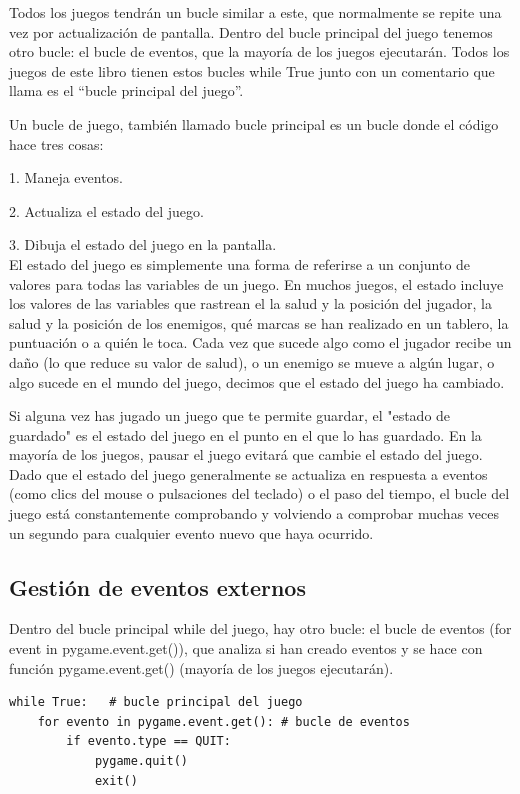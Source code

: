 Todos los juegos tendrán un bucle similar a este, que normalmente se repite una vez por actualización de pantalla.
Dentro del bucle principal del juego tenemos otro bucle: el bucle de eventos, que la mayoría de los juegos ejecutarán. Todos los juegos de este libro tienen estos bucles {\ttfamily while True} junto con un comentario que llama
es el “bucle principal del juego”. 

Un bucle de juego, también llamado bucle principal es un bucle donde el código hace tres cosas:

1. Maneja eventos.

2. Actualiza el estado del juego.

3. Dibuja el estado del juego en la pantalla.\\

El estado del juego es simplemente una forma de referirse a un conjunto de valores para todas las variables de un juego.
En muchos juegos, el estado incluye los valores de las variables que rastrean el la salud y la posición del jugador, 
la salud y la posición de los enemigos, qué marcas se han realizado en un tablero, la puntuación o a quién le toca. 
Cada vez que sucede algo como el jugador recibe un daño (lo que reduce su valor de salud), o un enemigo se mueve a algún lugar, o algo
sucede en el mundo del juego, decimos que el estado del juego ha cambiado.

Si alguna vez has jugado un juego que te permite guardar, el {}"{}estado de guardado"{} es el estado del juego en el punto en el que
lo has guardado. En la mayoría de los juegos, pausar el juego evitará que cambie el estado del juego.
Dado que el estado del juego generalmente se actualiza en respuesta a eventos (como clics del mouse o pulsaciones del teclado)
o el paso del tiempo, el bucle del juego está constantemente comprobando y volviendo a comprobar muchas veces
un segundo para cualquier evento nuevo que haya ocurrido. 

\subsection*{Gestión de eventos externos}

Dentro del bucle principal {\ttfamily while} del juego, hay  otro bucle: el bucle de eventos ({\ttfamily for event in pygame.event.get()}), que analiza si han creado eventos y se hace con  función {\ttfamily pygame.event.get()} (mayoría de los juegos ejecutarán).
\begin{lstlisting}
while True:   # bucle principal del juego
	for evento in pygame.event.get(): # bucle de eventos
		if evento.type == QUIT:
			pygame.quit()
			exit()	
\end{lstlisting}

